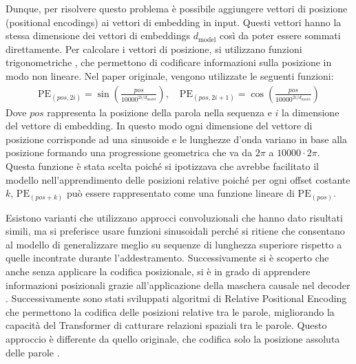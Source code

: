 Dunque, per risolvere questo problema è possibile aggiungere vettori di posizione (positional encodings) ai vettori di embedding in input. Questi vettori hanno la stessa dimensione dei vettori di embeddings  \(d_{\text{model}}\) così da poter essere sommati direttamente. Per calcolare i vettori di posizione, si utilizzano funzioni trigonometriche \cite{dufter2021positioninformationtransformersoverview}, che permettono di codificare informazioni sulla posizione in modo non lineare. Nel paper originale, vengono utilizzate le seguenti funzioni:
\begin{align}
	\text{PE}_{(pos, 2i)} = \sin\left(\frac{pos}{10000^{2i/d_{\text{model}}}}\right), \quad \text{PE}_{(pos, 2i+1)} = \cos\left(\frac{pos}{10000^{2i/d_{\text{model}}}}\right)
\end{align}
Dove \(pos\) rappresenta la posizione della parola nella sequenza e \(i\) la dimensione del vettore di embedding. In questo modo ogni dimensione del vettore di posizione corrisponde ad una sinusoide e le lunghezze d'onda variano in base alla posizione formando una progressione geometrica che va da \(2\pi\) a \(10000 \cdot 2\pi\). Questa funzione è stata scelta poiché si ipotizzava che avrebbe facilitato il modello nell'apprendimento delle posizioni relative poiché per ogni offset costante \(k\), \(\text{PE}_{(pos + k)}\) può essere rappresentato come una funzione lineare di \(\text{PE}_{(pos)}\).

Esistono varianti che utilizzano approcci convoluzionali \cite{gehring2017convolutionalsequencesequencelearning} che hanno dato risultati simili, ma si preferisce usare funzioni sinusoidali perché si ritiene che consentano al modello di generalizzare meglio su sequenze di lunghezza superiore rispetto a quelle incontrate durante l'addestramento. Successivamente si è scoperto che anche senza applicare la codifica posizionale, si è in grado di apprendere informazioni posizionali grazie all'applicazione della maschera causale nel decoder \cite{haviv2022transformerlanguagemodelspositional}.
Successivamente sono stati sviluppati algoritmi di Relative Positional Encoding \cite{shaw2018selfattentionrelativepositionrepresentations} che permettono la codifica delle posizioni relative tra le parole, migliorando la capacità del Transformer di catturare relazioni spaziali tra le parole. Questo approccio è differente da quello originale, che codifica solo la posizione assoluta delle parole \cite{ke2021rethinkingpositionalencodinglanguage}.